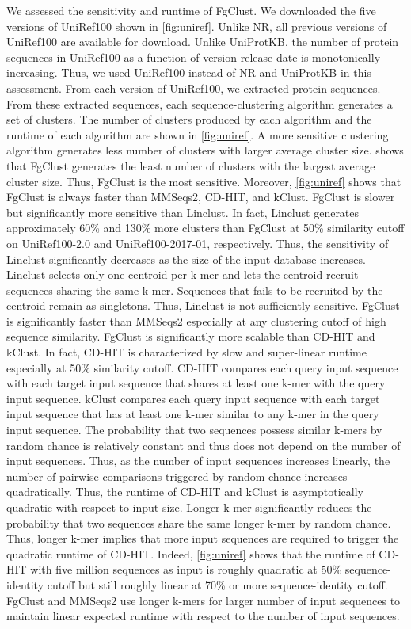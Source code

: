 \documentclass[11pt,letterpaper]{article}
\begin{document}
We assessed the sensitivity and runtime of FgClust.
We downloaded the five versions of UniRef100 \citep{suzek2007uniref} shown in \cref{fig:uniref}.
Unlike NR, all previous versions of UniRef100 are available for download.
Unlike UniProtKB, the number of protein sequences in UniRef100 as a function of version release date is monotonically increasing.
Thus, we used UniRef100 instead of NR and UniProtKB in this assessment.
From each version of UniRef100, we extracted protein sequences.
From these extracted sequences, each sequence-clustering algorithm generates a set of clusters.
The number of clusters produced by each algorithm and the runtime of each algorithm are shown in \cref{fig:uniref}.
A more sensitive clustering algorithm generates less number of clusters with larger average cluster size.
 shows that FgClust generates the least number of clusters with the largest average cluster size.
Thus, FgClust is the most sensitive.
Moreover, \cref{fig:uniref} shows that FgClust is always faster than MMSeqs2, CD-HIT, and kClust.
FgClust is slower but significantly more sensitive than Linclust.
In fact, Linclust generates approximately 60\% and 130\% more clusters than FgClust at 50\% similarity cutoff on UniRef100-2.0 and UniRef100-2017-01, respectively.
Thus, the sensitivity of Linclust significantly decreases as the size of the input database increases. 
Linclust selects only one centroid per k-mer and lets the centroid recruit sequences sharing the same k-mer.
Sequences that fails to be recruited by the centroid remain as singletons.
Thus, Linclust is not sufficiently sensitive.
FgClust is significantly faster than MMSeqs2 especially at any clustering cutoff of high sequence similarity.
FgClust is significantly more scalable than CD-HIT and kClust. 
In fact, CD-HIT is characterized by slow and super-linear runtime especially at 50\% similarity cutoff.
CD-HIT compares each query input sequence with each target input sequence that shares at least one k-mer with the query input sequence.
kClust compares each query input sequence with each target input sequence that has at least one k-mer similar to any k-mer in the query input sequence.
The probability that two sequences possess similar k-mers by random chance is relatively constant and thus does not depend on the number of input sequences.
Thus, as the number of input sequences increases linearly, the number of pairwise comparisons triggered by random chance increases quadratically.
Thus, the runtime of CD-HIT and kClust is asymptotically quadratic with respect to input size.
Longer k-mer significantly reduces the probability that two sequences share the same longer k-mer by random chance.
Thus, longer k-mer implies that more input sequences are required to trigger the quadratic runtime of CD-HIT.
Indeed, \cref{fig:uniref} shows that the runtime of CD-HIT with five million sequences as input is roughly quadratic at 50\% sequence-identity cutoff but still roughly linear at 70\% or more sequence-identity cutoff.
FgClust and MMSeqs2 use longer k-mers for larger number of input sequences to maintain linear expected runtime with respect to the number of input sequences.
\end{document}

